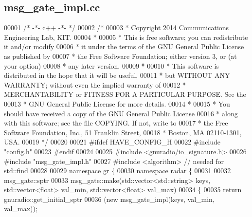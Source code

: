 \subsection{msg\+\_\+gate\+\_\+impl.\+cc}
\label{msg__gate__impl_8cc_source}

\begin{DoxyCode}
00001 \textcolor{comment}{/* -*- c++ -*- */}
00002 \textcolor{comment}{/* }
00003 \textcolor{comment}{ * Copyright 2014 Communications Engineering Lab, KIT.}
00004 \textcolor{comment}{ * }
00005 \textcolor{comment}{ * This is free software; you can redistribute it and/or modify}
00006 \textcolor{comment}{ * it under the terms of the GNU General Public License as published by}
00007 \textcolor{comment}{ * the Free Software Foundation; either version 3, or (at your option)}
00008 \textcolor{comment}{ * any later version.}
00009 \textcolor{comment}{ * }
00010 \textcolor{comment}{ * This software is distributed in the hope that it will be useful,}
00011 \textcolor{comment}{ * but WITHOUT ANY WARRANTY; without even the implied warranty of}
00012 \textcolor{comment}{ * MERCHANTABILITY or FITNESS FOR A PARTICULAR PURPOSE.  See the}
00013 \textcolor{comment}{ * GNU General Public License for more details.}
00014 \textcolor{comment}{ * }
00015 \textcolor{comment}{ * You should have received a copy of the GNU General Public License}
00016 \textcolor{comment}{ * along with this software; see the file COPYING.  If not, write to}
00017 \textcolor{comment}{ * the Free Software Foundation, Inc., 51 Franklin Street,}
00018 \textcolor{comment}{ * Boston, MA 02110-1301, USA.}
00019 \textcolor{comment}{ */}
00020  
00021 \textcolor{preprocessor}{#ifdef HAVE\_CONFIG\_H}
00022 \textcolor{preprocessor}{#include "config.h"}
00023 \textcolor{preprocessor}{#endif}
00024 
00025 \textcolor{preprocessor}{#include <gnuradio/io\_signature.h>}
00026 \textcolor{preprocessor}{#include "msg_gate_impl.h"}
00027 \textcolor{preprocessor}{#include <algorithm>} \textcolor{comment}{// needed for std::find}
00028 
00029 \textcolor{keyword}{namespace }gr \{
00030   \textcolor{keyword}{namespace }radar \{
00031 
00032     msg_gate::sptr
00033     msg_gate::make(std::vector<std::string> keys, std::vector<float> val\_min, std::vector<float> val\_max)
00034     \{
00035       \textcolor{keywordflow}{return} gnuradio::get\_initial\_sptr
00036         (\textcolor{keyword}{new} msg_gate_impl(keys, val\_min, val\_max));

\end{DoxyCode}
